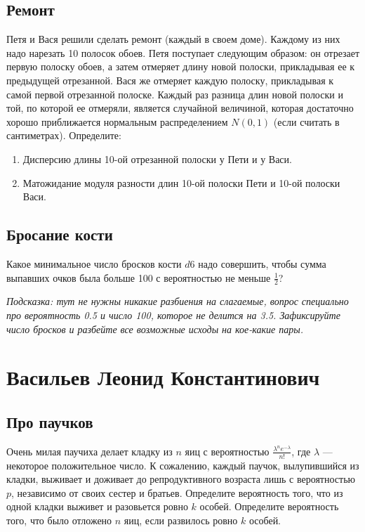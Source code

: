 \documentclass[12pt]{article}
\begin{document}
\subsection{Ремонт}
Петя и Вася решили сделать ремонт (каждый в своем доме). Каждому из них надо нарезать 10 полосок обоев. Петя поступает следующим образом: он отрезает первую полоску обоев, а затем отмеряет длину новой полоски, прикладывая ее к предыдущей отрезанной. Вася же отмеряет каждую полоску, прикладывая к самой первой отрезанной полоске. Каждый раз разница длин новой полоски и той, по которой ее отмеряли, является случайной величиной, которая достаточно хорошо приближается нормальным распределением $N(0, 1)$ (если считать в сантиметрах). Определите:
\begin{enumerate}
    \item Дисперсию длины 10-ой отрезанной полоски у Пети и у Васи.
    \item Матожидание модуля разности длин 10-ой полоски Пети и 10-ой полоски Васи. 
\end{enumerate}

\subsection{Бросание кости}
Какое минимальное число бросков кости $d6$ надо совершить, чтобы сумма выпавших очков была больше 100 с вероятностью не меньше $\frac{1}{2}$? 

\emph{Подсказка: тут не нужны никакие разбиения на слагаемые, вопрос специально про вероятность 0.5 и число 100, которое не делится на 3.5. Зафиксируйте число бросков и разбейте все возможные исходы на кое-какие пары.}

\newpage
\section{Васильев Леонид Константинович}

\subsection{Про паучков}
Очень милая паучиха делает кладку из $n$ яиц с вероятностью $\frac{\lambda^n e^{-\lambda}}{n!}$, где $\lambda$ --- некоторое положительное число. К сожалению, каждый паучок, вылупившийся из кладки, выживает и доживает до репродуктивного возраста лишь с вероятностью $p$, независимо от своих сестер и братьев. Определите вероятность того, что из одной кладки выживет и разовьется ровно $k$ особей. Определите вероятность того, что было отложено $n$ яиц, если развилось ровно $k$ особей.
\end{document}
